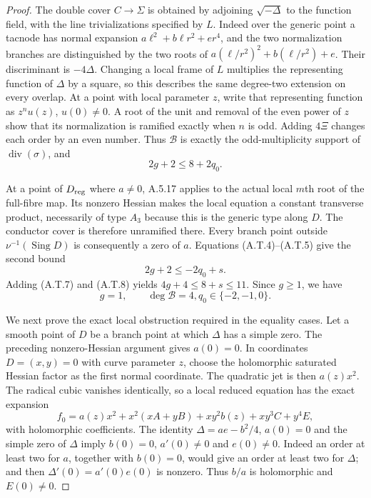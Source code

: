 \begin{proof}
The double cover $C\to\Sigma$ is obtained by adjoining
$\sqrt{-\Delta}$ to the function field, with the line
trivializations specified by $L$. Indeed over the
generic point a tacnode has normal expansion
$a\ell^2+b\ell r^2+er^4$, and the two normalization
branches are distinguished by the two roots of
$a(\ell/r^2)^2+b(\ell/r^2)+e$. Their discriminant
is $-4\Delta$. Changing a local frame of $L$ multiplies
the representing function of $\Delta$ by a square,
so this describes the same degree-two extension on
every overlap. At a point with local parameter $z$,
write that representing function as $z^n u(z)$,
$u(0)\ne0$. A root of the unit and removal of the
even power of $z$ show that its normalization is
ramified exactly when $n$ is odd. Adding $4\Xi$ changes
each order by an even number. Thus $\mathcal B$ is
exactly the odd-multiplicity support of
$\operatorname{div}(\sigma)$, and
\[
                  2g+2\le 8+2q_0.                 \tag{A.T.7}
\]

At a point of $D_{\rm reg}$ where $a\ne0$, A.5.17
applies to the actual local $m$th root of the full-fibre
map. Its nonzero Hessian makes the local equation a
constant transverse product, necessarily of type
$A_3$ because this is the generic type along $D$.
The conductor cover is therefore unramified there.
Every branch point outside $\nu^{-1}(\operatorname{Sing}D)$
is consequently a zero of $a$. Equations (A.T.4)--(A.T.5)
give the second bound
\[
                    2g+2\le -2q_0+s.              \tag{A.T.8}
\]
Adding (A.T.7) and (A.T.8) yields
$4g+4\le8+s\le11$. Since $g\ge1$, we have
\[
           g=1,\qquad \deg\mathcal B=4,
                    q_0\in\{-2,-1,0\}.            \tag{A.T.9}
\]

We next prove the exact local obstruction required in
the equality cases. Let a smooth point of $D$ be a
branch point at which $\Delta$ has a simple zero.
The preceding nonzero-Hessian argument gives $a(0)=0$.
In coordinates $D=(x,y)=0$ with curve parameter $z$,
choose the holomorphic saturated Hessian factor as the
first normal coordinate. The quadratic jet is then
$a(z)x^2$. The radical cubic vanishes identically,
so a local reduced equation has the exact expansion
\[
 f_0=a(z)x^2+x^2(xA+yB)+xy^2b(z)+xy^3C+y^4E,
                                                        \tag{A.T.10}
\]
with holomorphic coefficients. The identity
$\Delta=ae-b^2/4$, $a(0)=0$ and the simple zero of
$\Delta$ imply $b(0)=0$, $a'(0)\ne0$ and $e(0)\ne0$.
Indeed an order at least two for $a$, together with
$b(0)=0$, would give an order at least two for $\Delta$;
and then $\Delta'(0)=a'(0)e(0)$ is nonzero.
Thus $b/a$ is holomorphic and $E(0)\ne0$.


\end{proof}

